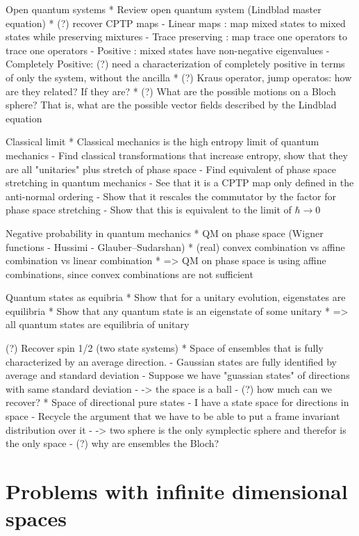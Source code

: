 Open quantum systems
* Review open quantum system (Lindblad master equation)
* (?) recover CPTP maps 
- Linear maps : map mixed states to mixed states while preserving mixtures
- Trace preserving : map trace one operators to trace one operators
- Positive : mixed states have non-negative eigenvalues
- Completely Positive: (?) need a characterization of completely positive in terms of only the system, without the ancilla
* (?) Kraus operator, jump operatos: how are they related? If they are?
* (?) What are the possible motions on a Bloch sphere? That is, what are the possible vector fields described by the Lindblad equation

Classical limit
* Classical mechanics is the high entropy limit of quantum mechanics
- Find classical transformations that increase entropy, show that they are all "unitaries" plus stretch of phase space
- Find equivalent of phase space stretching in quantum mechanics
- See that it is a CPTP map only defined in the anti-normal ordering
- Show that it rescales the commutator by the factor for phase space stretching
- Show that this is equivalent to the limit of $\hbar \to 0$

Negative probability in quantum mechanics
* QM on phase space (Wigner functions - Hussimi - Glauber–Sudarshan)
* (real) convex combination vs affine combination vs linear combination
* => QM on phase space is using affine combinations, since convex combinations are not sufficient

Quantum states as equibria
* Show that for a unitary evolution, eigenstates are equilibria
* Show that any quantum state is an eigenstate of some unitary
* => all quantum states are equilibria of unitary

(?) Recover spin 1/2 (two state systems)
* Space of ensembles that is fully characterized by an average direction.
  - Gaussian states are fully identified by average and standard deviation
  - Suppose we have "guassian states" of directions with same standard deviation
  - -> the space is a ball
  - (?) how much can we recover?
* Space of directional pure states
  - I have a state space for directions in space
  - Recycle the argument that we have to be able to put a frame invariant distribution over it
  - -> two sphere is the only symplectic sphere and therefor is the only space
  - (?) why are ensembles the Bloch?

\section{Problems with infinite dimensional spaces}

